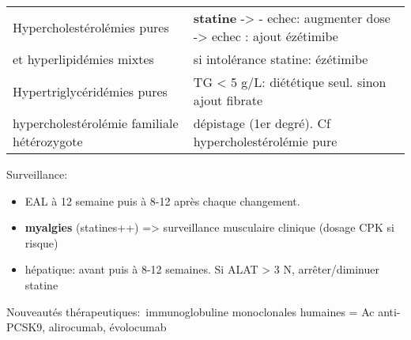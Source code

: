 \documentclass[11pt]{article}
\begin{document}
\begin{center}
\begin{tabular}{ll}
Hypercholestérolémies pures & \textbf{statine} -> - echec: augmenter dose -> echec : ajout ézétimibe\\
et hyperlipidémies mixtes & si intolérance statine: ézétimibe\\
\hline
Hypertriglycéridémies pures & TG < 5 g/L:  diététique seul. sinon ajout fibrate\\
hypercholestérolémie familiale hétérozygote & dépistage (1er degré). Cf hypercholestérolémie pure\\
\end{tabular}
\end{center}


Surveillance:
\begin{itemize}
\item EAL à 12 semaine puis à 8-12 après chaque changement.
\item \textbf{myalgies} (statines++) => surveillance musculaire clinique (dosage CPK si risque)
\item hépatique: avant puis à 8-12 semaines. Si ALAT >  3 N, arrêter/diminuer statine
\end{itemize}

Nouveautés thérapeutiques: immunoglobuline monoclonales humaines = Ac anti-PCSK9, alirocumab, évolocumab
\end{document}
